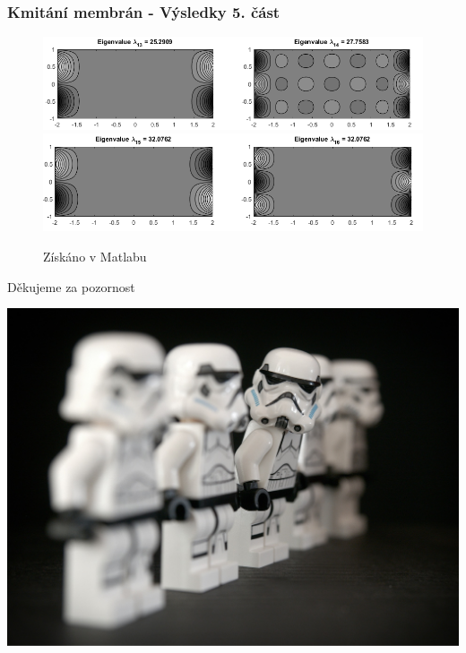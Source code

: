 \documentclass[xcolor=table]{beamer}
\begin{document}
\begin{frame}
\frametitle{Kmitání membrán - Výsledky 5. část}
\centering
\begin{figure}
\includegraphics[width=1\linewidth]{obdelnicky7.png}
\includegraphics[width=1\linewidth]{obdelnicky8.png}
\caption{Získáno v Matlabu}
\end{figure}
\end{frame}

\begin{frame}
\begin{center}
\begin{huge}
Děkujeme za pozornost
\end{huge}
  \centering
  \includegraphics[width=.8\linewidth]{stormtroop.jpg}
\end{center}

\end{frame}
\end{document}
